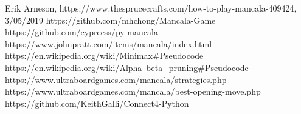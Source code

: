 \documentclass[conference]{IEEEtran}
\begin{document}



\begin{thebibliography}{00}
 Erik Arneson, https://www.thesprucecrafts.com/how-to-play-mancala-409424, 3/05/2019
 https://github.com/mhchong/Mancala-Game
 https://github.com/cypreess/py-mancala
 https://www.johnpratt.com/items/mancala/index.html
 https://en.wikipedia.org/wiki/Minimax\#Pseudocode
 https://en.wikipedia.org/wiki/Alpha–beta\_pruning\#Pseudocode
 https://www.ultraboardgames.com/mancala/strategies.php
 https://www.ultraboardgames.com/mancala/best-opening-move.php
 https://github.com/KeithGalli/Connect4-Python
\end{thebibliography}
\end{document}

